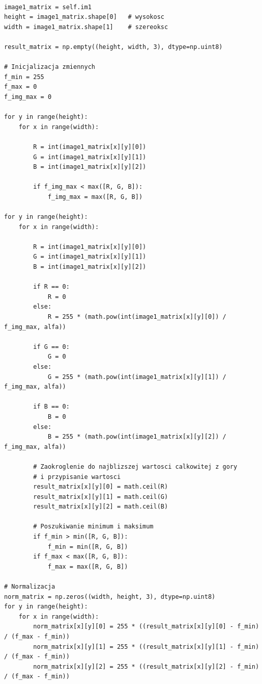 \documentclass[final,a4paper,openany,12pt]{mwbk}
\begin{document}
\begin{lstlisting}[caption= Potęgowanie obrazu barwowego]

image1_matrix = self.im1
height = image1_matrix.shape[0]   # wysokosc
width = image1_matrix.shape[1]    # szereoksc

result_matrix = np.empty((height, width, 3), dtype=np.uint8)

# Inicjalizacja zmiennych
f_min = 255
f_max = 0
f_img_max = 0

for y in range(height):
    for x in range(width):  

        R = int(image1_matrix[x][y][0])
        G = int(image1_matrix[x][y][1])
        B = int(image1_matrix[x][y][2])

        if f_img_max < max([R, G, B]):
            f_img_max = max([R, G, B])

for y in range(height):
    for x in range(width):  

        R = int(image1_matrix[x][y][0])
        G = int(image1_matrix[x][y][1])
        B = int(image1_matrix[x][y][2])

        if R == 0:
            R = 0
        else:
            R = 255 * (math.pow(int(image1_matrix[x][y][0]) / f_img_max, alfa))

        if G == 0:
            G = 0
        else:
            G = 255 * (math.pow(int(image1_matrix[x][y][1]) / f_img_max, alfa))
        
        if B == 0:
            B = 0
        else:
            B = 255 * (math.pow(int(image1_matrix[x][y][2]) / f_img_max, alfa))

        # Zaokroglenie do najblizszej wartosci calkowitej z gory
        # i przypisanie wartosci
        result_matrix[x][y][0] = math.ceil(R)
        result_matrix[x][y][1] = math.ceil(G)
        result_matrix[x][y][2] = math.ceil(B)

        # Poszukiwanie minimum i maksimum                
        if f_min > min([R, G, B]):
            f_min = min([R, G, B])
        if f_max < max([R, G, B]):
            f_max = max([R, G, B])

# Normalizacja
norm_matrix = np.zeros((width, height, 3), dtype=np.uint8)
for y in range(height):
    for x in range(width):
        norm_matrix[x][y][0] = 255 * ((result_matrix[x][y][0] - f_min) / (f_max - f_min))
        norm_matrix[x][y][1] = 255 * ((result_matrix[x][y][1] - f_min) / (f_max - f_min))
        norm_matrix[x][y][2] = 255 * ((result_matrix[x][y][2] - f_min) / (f_max - f_min))


\end{lstlisting}
\end{document}

